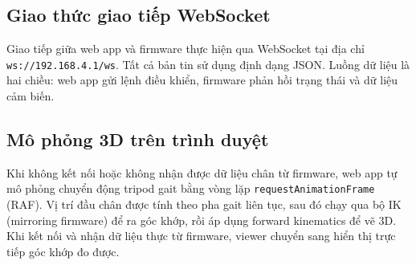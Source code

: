         \subsection{Giao thức giao tiếp WebSocket}

        \hspace{0.5cm} Giao tiếp giữa web app và firmware thực hiện qua WebSocket tại địa chỉ \texttt{ws://192.168.4.1/ws}. Tất cả bản tin sử dụng định dạng JSON. Luồng dữ liệu là hai chiều: web app gửi lệnh điều khiển, firmware phản hồi trạng thái và dữ liệu cảm biến.

        \subsection{Mô phỏng 3D trên trình duyệt}

        \hspace{0.5cm} Khi không kết nối hoặc không nhận được dữ liệu chân từ firmware, web app tự mô phỏng chuyển động tripod gait bằng vòng lặp \texttt{requestAnimationFrame} (RAF). Vị trí đầu chân được tính theo pha gait liên tục, sau đó chạy qua bộ IK (mirroring firmware) để ra góc khớp, rồi áp dụng forward kinematics để vẽ 3D. Khi kết nối và nhận dữ liệu thực từ firmware, viewer chuyển sang hiển thị trực tiếp góc khớp đo được.

